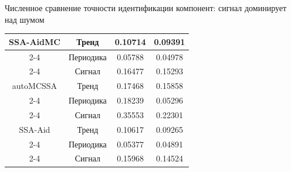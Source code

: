 \documentclass[pdf,notheorems,10pt,intlimits,unicode]{beamer}
\begin{document}
\begin{frame}{Численное сравнение точности идентификации компонент: сигнал доминирует над шумом}
\begin{table}[h!]
{{\begin{tabular}{c|c|c|c}
                    \hline
                    SSA-AidMC & Тренд      & 0.10714  & 0.09391    \\
                    \cline{2-4}
                              & Периодика  & 0.05788  & 0.04978    \\
                    \cline{2-4}
                              & Сигнал     & 0.16477  & 0.15293    \\
                    \hline
                    autoMCSSA & Тренд      & 0.17468  & 0.15858    \\
                    \cline{2-4}
                              & Периодика  & 0.18239  & 0.05296    \\
                    \cline{2-4}
                              & Сигнал     & 0.35553  & 0.22301    \\
                    \hline
                    SSA-Aid   & Тренд      & 0.10617  & 0.09265    \\
                    \cline{2-4}
                              & Периодика  & 0.05377  & 0.04891    \\
                    \cline{2-4}
                              & Сигнал     & 0.15968  & 0.14524    \\
                    \hline
                \end{tabular}}
        }
    \end{table}

\end{frame}
\end{document}
